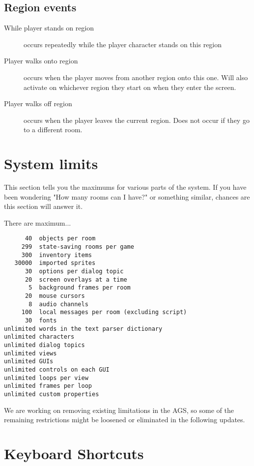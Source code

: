 \subsection{Region events}%

\begin{description}
\item [While player stands on region] occurs repeatedly while the player character stands on this region
\item [Player walks onto region] occurs when the player moves from another region onto this one. Will
  also activate on whichever region they start on when they enter the screen.
\item [Player walks off region] occurs when the player leaves the current region. Does not occur
  if they go to a different room.
\end{description}



\section{System limits}%

This section tells you the maximums for various parts of the system. If you
have been wondering "How many rooms can I have?" or something similar,
chances are this section will answer it.

There are maximum...
\begin{verbatim}
      40  objects per room
     299  state-saving rooms per game
     300  inventory items
   30000  imported sprites
      30  options per dialog topic
      20  screen overlays at a time
       5  background frames per room
      20  mouse cursors
       8  audio channels
     100  local messages per room (excluding script)
      30  fonts
unlimited words in the text parser dictionary
unlimited characters
unlimited dialog topics
unlimited views
unlimited GUIs
unlimited controls on each GUI
unlimited loops per view
unlimited frames per loop
unlimited custom properties
\end{verbatim}

We are working on removing existing limitations in the AGS, so some of the remaining
restrictions might be loosened or eliminated in the following updates.

\section{Keyboard Shortcuts}\label{KeyboardShortcuts}%

